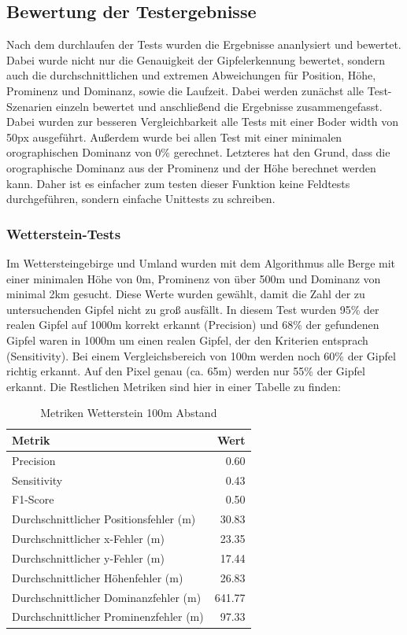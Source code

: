 \subsection{Bewertung der Testergebnisse}\label{subsec:bewertung_der_testergebnisse}
Nach dem durchlaufen der Tests wurden die Ergebnisse ananlysiert und bewertet. Dabei wurde nicht nur die Genauigkeit der Gipfelerkennung bewertet, sondern auch die durchschnittlichen und extremen Abweichungen für Position, Höhe, Prominenz und Dominanz, sowie die Laufzeit. Dabei werden zunächst alle Test-Szenarien einzeln bewertet und anschließend die Ergebnisse zusammengefasst. Dabei wurden zur besseren Vergleichbarkeit alle Tests mit einer Boder width von 50px ausgeführt.  Außerdem wurde bei allen Test mit einer minimalen orographischen Dominanz von 0\% gerechnet. Letzteres hat den Grund, dass die orographische Dominanz aus der Prominenz und der Höhe berechnet werden kann. Daher ist es einfacher zum testen dieser Funktion keine Feldtests durchgeführen, sondern einfache Unittests zu schreiben. 

\subsubsection{Wetterstein-Tests}
Im Wettersteingebirge und Umland wurden mit dem Algorithmus alle Berge mit einer minimalen Höhe von 0m, Prominenz von über 500m und Dominanz von minimal 2km gesucht. Diese Werte wurden gewählt, damit die Zahl der zu untersuchenden Gipfel nicht zu groß ausfällt. In diesem Test wurden 95\% der realen Gipfel auf 1000m korrekt erkannt (Precision) und 68\% der gefundenen Gipfel waren in 1000m um einen realen Gipfel, der den Kriterien entsprach (Sensitivity).  Bei einem Vergleichsbereich von 100m werden noch 60\% der Gipfel richtig erkannt. Auf den Pixel genau (ca. 65m) werden nur 55\% der Gipfel erkannt. Die Restlichen Metriken sind hier in einer Tabelle zu finden: 

\begin{table}[htbp]
\centering
\caption{Metriken Wetterstein 100m Abstand}
\label{tab:metrics_100m_circular}
\begin{tabular}{|l|r|}
\hline
Metrik & Wert \\
\hline
Precision & 0.60 \\ 
\hline
Sensitivity & 0.43 \\
\hline
F1-Score & 0.50 \\
\hline
Durchschnittlicher Positionsfehler (m) & 30.83 \\
\hline
Durchschnittlicher x-Fehler (m) & 23.35 \\
\hline
Durchschnittlicher y-Fehler (m) & 17.44 \\
\hline
Durchschnittlicher Höhenfehler (m) & 26.83 \\
\hline
Durchschnittlicher Dominanzfehler (m) & 641.77 \\
\hline
Durchschnittlicher Prominenzfehler (m) & 97.33 \\
\hline
\end{tabular}
\end{table}

